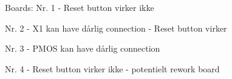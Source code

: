 Boards:
Nr. 1
- Reset button virker ikke

Nr. 2
- X1 kan have dårlig connection
- Reset button virker

Nr. 3 
- PMOS kan have dårlig connection

Nr. 4
- Reset button virker ikke
- potentielt rework board